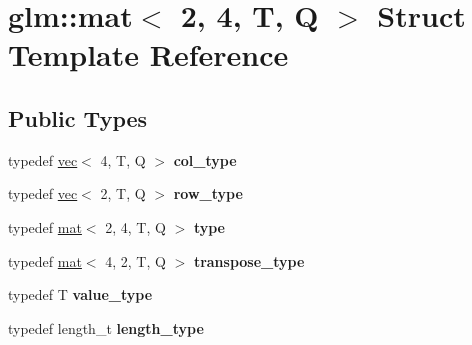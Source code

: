 \hypertarget{structglm_1_1mat_3_012_00_014_00_01T_00_01Q_01_4}{}\section{glm\+:\+:mat$<$ 2, 4, T, Q $>$ Struct Template Reference}
\label{structglm_1_1mat_3_012_00_014_00_01T_00_01Q_01_4}
\subsection*{Public Types}
\begin{DoxyCompactItemize}
\item 
\mbox{\label{structglm_1_1mat_3_012_00_014_00_01T_00_01Q_01_4_ae14ad10a9d8ce3908ec89ae373a27872}} 
typedef \hyperlink{structglm_1_1vec}{vec}$<$ 4, T, Q $>$ {\bfseries col\+\_\+type}
\item 
\mbox{\label{structglm_1_1mat_3_012_00_014_00_01T_00_01Q_01_4_af7681d37f1454b1e18754262a65eb6d1}} 
typedef \hyperlink{structglm_1_1vec}{vec}$<$ 2, T, Q $>$ {\bfseries row\+\_\+type}
\item 
\mbox{\label{structglm_1_1mat_3_012_00_014_00_01T_00_01Q_01_4_a04c04d7f08549f03063d04bca3a76ae5}} 
typedef \hyperlink{structglm_1_1mat}{mat}$<$ 2, 4, T, Q $>$ {\bfseries type}
\item 
\mbox{\label{structglm_1_1mat_3_012_00_014_00_01T_00_01Q_01_4_a5030a7f34454a6871ed17c1b27cc0929}} 
typedef \hyperlink{structglm_1_1mat}{mat}$<$ 4, 2, T, Q $>$ {\bfseries transpose\+\_\+type}
\item 
\mbox{\label{structglm_1_1mat_3_012_00_014_00_01T_00_01Q_01_4_a837bd82ca90340b03c7ee19f598c5133}} 
typedef T {\bfseries value\+\_\+type}
\item 
\mbox{\label{structglm_1_1mat_3_012_00_014_00_01T_00_01Q_01_4_a5295c484627e965d615f3367c2ca45d8}} 
typedef length\+\_\+t {\bfseries length\+\_\+type}
\end{DoxyCompactItemize}
